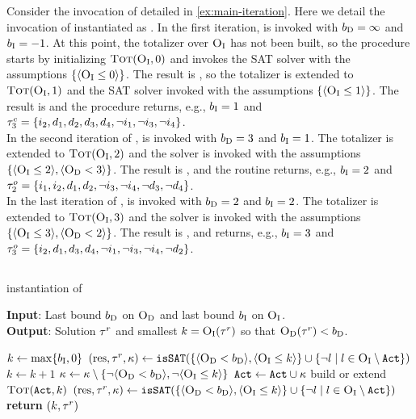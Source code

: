 \begin{example}
  Consider the invocation of \algname{} detailed in \cref{ex:main-iteration}. 
  Here we detail the invocation of \Min{} instantiated as \unsatsat{}.
  In the first iteration, \unsatsat{} is invoked with $b_{\text{D}} = \infty$ and $b_{\text{I}}=-1$.
  At this point, the totalizer over $\textsc{O}_{\text{I}}$ has not been built, so the procedure starts by initializing $\textsc{Tot}(\textsc{O}_{\text{I}}, 0)$ and invokes the SAT solver with the assumptions $\{\langle \textsc{O}_{\text{I}} \leq 0 \rangle\}$.
  The result is \unsat{}, so the totalizer is extended to $\textsc{Tot}(\textsc{O}_{\text{I}}, 1)$ and the SAT solver invoked with the assumptions $\{ \langle \textsc{O}_{\text{I}} \leq 1 \rangle\}$.
  The result is \sat{} and the procedure returns, e.g., $b_{\text{I}} = 1$ and $\tau^c_3 = \{i_2,\allowbreak d_1,\allowbreak d_2,\allowbreak d_3,\allowbreak d_4,\allowbreak \lnot i_1,\allowbreak \lnot i_3,\allowbreak \lnot i_4\}$. \\
  In the second iteration of \algname{}, \unsatsat{} is invoked with $b_{\text{D}} = 3$ and $b_{\text{I}} = 1$.
  The totalizer is extended to $\textsc{Tot}(\textsc{O}_{\text{I}}, 2)$ and the solver is invoked with the assumptions $\{\langle \textsc{O}_{\text{I}} \leq 2 \rangle, \langle \textsc{O}_{\text{D}} < 3 \rangle\}$.
  The result is \sat{}, and the routine returns, e.g., $b_{\text{I}} = 2$ and $\tau^o_2 = \{i_1,\allowbreak i_2,\allowbreak d_1,\allowbreak d_2,\allowbreak \lnot i_3,\allowbreak \lnot i_4,\allowbreak \lnot d_3,\allowbreak \lnot d_4\}$. \\
  In the last iteration of \algname{}, \unsatsat{} is invoked with $b_{\text{D}} = 2$ and $b_{\text{I}} = 2$.
  The totalizer is extended to $\textsc{Tot}(\textsc{O}_{\text{I}}, 3)$ and the solver is invoked with the assumptions $\{\langle \textsc{O}_{\text{I}} \leq 3 \rangle, \langle \textsc{O}_{\text{D}} < 2 \rangle\}$.
  The result is \sat{}, and \unsatsat{} returns, e.g., $b_{\text{I}} = 3$ and $\tau^o_3 = \{i_2,\allowbreak d_1,\allowbreak d_3,\allowbreak d_4,\allowbreak \lnot i_1,\allowbreak \lnot i_3,\allowbreak \lnot i_4,\allowbreak \lnot d_2\}$.
\end{example}

\subsection{\msu{}\label{sec:msu}}

\begin{algorithm}[t]
  \caption{\msu{} instantiation of \Min{}}\label{alg:msu}
  \textbf{Input}: Last bound $b_{\text{D}}$ on $\textsc{O}_{\text{D}}$ and last bound $b_{\text{I}}$ on $\textsc{O}_{\text{I}}$. \\
  \textbf{Output}: Solution $\tau^r$ and smallest $k=\textsc{O}_{\text{I}}(\tau^r)$ so that $\textsc{O}_{\text{D}}(\tau^r)<b_{\text{D}}$.

  \begin{algorithmic}[1]
    \STATE $k \gets \max\{b_{\text{I}},0\}$
    \STATE $(\text{res},\tau^r,\kappa) \gets \texttt{isSAT}(\{\langle \textsc{O}_{\text{D}} < b_{\text{D}} \rangle, \langle \textsc{O}_{\text{I}} \leq k \rangle\} \cup \{\lnot l \mid l \in \textsc{O}_{\text{I}} \setminus \texttt{Act}\})$ \label{ln:msu-firstquery}
    \WHILE{$\res = \unsat$}
      \STATE $k \gets k+1$ \label{ln:msu-inc}
      \STATE $\kappa \gets \kappa \setminus \{\lnot\langle \textsc{O}_{\text{D}} < b_{\text{D}} \rangle, \lnot\langle \textsc{O}_{\text{I}} \leq k \rangle\}$
      \STATE $\texttt{Act} \gets \texttt{Act} \cup \kappa$
      \STATE build or extend $\textsc{Tot}(\texttt{Act},k)$ \label{ln:msu-tot}
      \STATE $(\text{res},\tau^r,\kappa) \gets \texttt{isSAT}(\{\langle \textsc{O}_{\text{D}} < b_{\text{D}} \rangle, \langle \textsc{O}_{\text{I}} \leq k \rangle\} \cup \{\lnot l \mid l \in \textsc{O}_{\text{I}} \setminus \texttt{Act}\})$ \label{ln:msu-mainquery}
    \ENDWHILE
    \STATE \textbf{return} $(k,\tau^r)$
  \end{algorithmic}
\end{algorithm}

